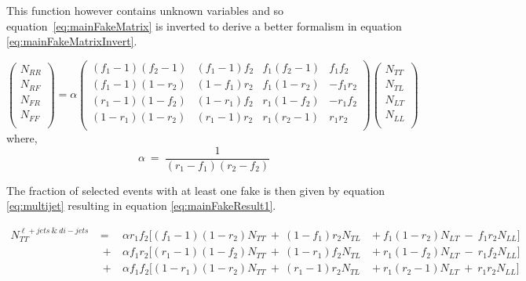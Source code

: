This function however contains unknown variables and so equation~\ref{eq:mainFakeMatrix} is inverted to derive a better formalism in equation \ref{eq:mainFakeMatrixInvert}.

\begin{equation} \label{eq:mainFakeMatrixInvert}
   \begin{pmatrix}
      N_{RR} \\
      N_{RF} \\
      N_{FR} \\
      N_{FF} \\
   \end{pmatrix}
   = \alpha
   \begin{pmatrix}
      (f_{1}-1)(f_{2}-1) & (f_{1}-1)f_{2} & f_{1}(f_{2}-1) & f_{1}f_{2} \\
      (f_{1}-1)(1-r_{2}) & (1-f_{1})r_{2} & f_{1}(1-r_{2}) & -f_{1}r_{2} \\
      (r_{1}-1)(1-f_{2}) & (1-r_{1})f_{2} & r_{1}(1-f_{2}) & -r_{1}f_{2} \\
      (1-r_{1})(1-r_{2}) & (r_{1}-1)r_{2} & r_{1}(r_{2}-1) & r_{1}r_{2} \\
   \end{pmatrix}
   \begin{pmatrix}
      N_{TT} \\
      N_{TL} \\
      N_{LT} \\
      N_{LL} \\
   \end{pmatrix}
\end{equation}
where,
\begin{equation}
   \alpha~=~\frac{1}{(r_{1}-f_{1})(r_{2}-f_{2})}
\end{equation}

The fraction of selected events with at least one fake is then given by equation \ref{eq:multijet} resulting in equation \ref{eq:mainFakeResult1}.

\begin{equation} \label{eq:mainFakeResult1}
\begin{aligned}
   N^{\ell+jets~\&~di-jets}_{TT}~&=&~\alpha r_{1}f_{2}[(f_{1}-1)(1-r_{2})N_{TT}~+~(1-f_{1})r_{2}N_{TL}~&+~f_{1}(1-r_{2})N_{LT}~-~f_{1}r_{2}N_{LL}] \\
      &~+&~\alpha f_{1}r_{2}[(r_{1}-1)(1-f_{2})N_{TT}~+~(1-r_{1})f_{2}N_{TL}~&+~r_{1}(1-f_{2})N_{LT}~-~r_{1}f_{2}N_{LL}] \\
      &~+&~\alpha f_{1}f_{2}[(1-r_{1})(1-r_{2})N_{TT}~+~(r_{1}-1)r_{2}N_{TL}~&+~r_{1}(r_{2}-1)N_{LT}~+~r_{1}r_{2}N_{LL}] 
\end{aligned}
\end{equation}

